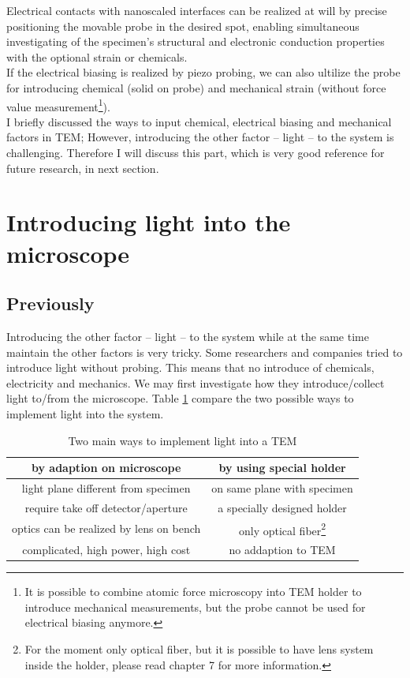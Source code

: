 Electrical contacts with nanoscaled interfaces can be realized at will by precise positioning the movable probe in the desired spot, enabling simultaneous investigating of the specimen’s structural and electronic conduction properties with the optional strain or chemicals.\\

If the electrical biasing is realized by piezo probing, we can also ultilize the probe for introducing chemical (solid on probe) and mechanical strain (without force value measurement\footnote{It is possible to combine atomic force microscopy into TEM holder to introduce mechanical measurements, but the probe cannot be used for electrical biasing anymore.}). \\

I briefly discussed the ways to input chemical, electrical biasing and mechanical factors in TEM; However, introducing the other factor -- light -- to the system is challenging. Therefore I will discuss this part, which is very good reference for future research, in next section. 

\section{Introducing light into the microscope}
\subsection{Previously}
Introducing the other factor -- light -- to the system while at the same time maintain the other factors is very tricky. Some researchers and companies tried to introduce light without probing. This means that no introduce of chemicals, electricity and mechanics. We may first investigate how they introduce/collect light to/from the microscope. 
Table \ref{table2.1} compare the two possible ways to implement light into the system. 

\begin{table}[ht]
\centering 
\begin{tabular}{|c|c|} 
\hline 
by adaption on microscope & by using special holder \\ [0.5ex] 
\hline 
light plane different from specimen & on same plane with specimen \\[1.5ex] 
require take off detector/aperture & a specially designed holder \\[1.5ex]
optics can be realized by lens on bench & only optical fiber\footnote{For the moment only optical fiber, but it is possible to have lens system inside the holder, please read chapter 7 for more information.} \\[1.5ex]
complicated, high power, high cost & no addaption to TEM\\[1.5ex]
\hline
\end{tabular}
\caption{Two main ways to implement light into a TEM} 
\label{table2.1} 
\end{table}

